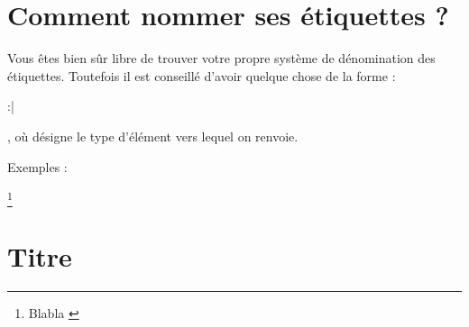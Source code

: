 \section{Comment nommer ses étiquettes ?}

Vous êtes bien sûr libre de trouver votre propre système de dénomination des étiquettes. Toutefois il est conseillé d'avoir quelque chose de la forme : \begin{english}:|\end{english}, où  désigne le type d'élément vers lequel on renvoie.

Exemples :
\begin{english}
\begin{latexcode}
\footnote{Blabla \label{note:nom}}
\section{Titre \label{section:nom}}
\end{latexcode}
\end{english}


